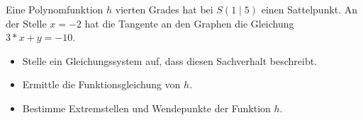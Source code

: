 
Eine Polynomfunktion $h$ vierten Grades hat bei $S(1 \mid 5)$ einen Sattelpunkt. An der
Stelle $x=-2$ hat die Tangente an den Graphen die Gleichung $3*x + y = -10$.

\begin{itemize}
	\item Stelle ein Gleichungssystem auf, dass diesen Sachverhalt beschreibt.
	\item Ermittle die Funktionsgleichung von $h$.
	\item Bestimme Extremstellen und Wendepunkte der Funktion $h$.
\end{itemize}
